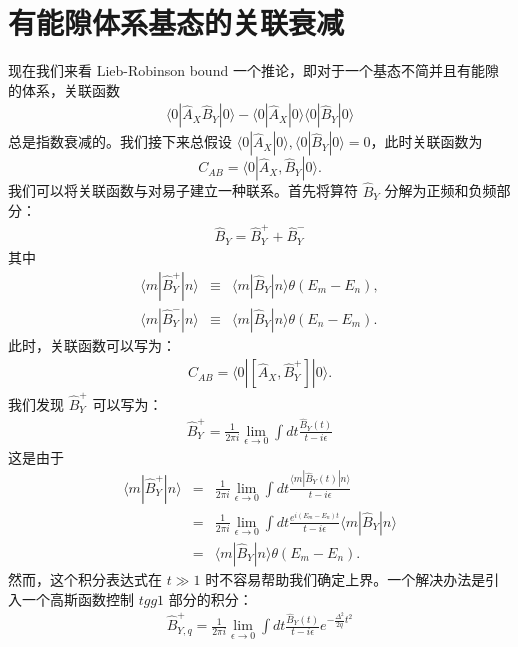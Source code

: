 \documentclass[10pt,UTF8]{ctexart}
\begin{document}
\section*{有能隙体系基态的关联衰减}
\noindent
现在我们来看 Lieb-Robinson bound 一个推论，即对于一个基态不简并且有能隙的体系，关联函数
\begin{eqnarray}
	\langle 0| \hat A_X \hat B_Y |0\rangle - \langle 0| \hat A_X |0\rangle \langle 0|\hat B_Y |0\rangle
\end{eqnarray}
总是指数衰减的。我们接下来总假设 $\langle 0| \hat A_X |0\rangle, \langle 0| \hat B_Y |0\rangle = 0$，此时关联函数为
\begin{equation}
	C_{AB} = \langle 0| \hat A_X, \hat B_Y |0\rangle.
\end{equation}
我们可以将关联函数与对易子建立一种联系。首先将算符 $\hat B_Y$ 分解为正频和负频部分：
\begin{eqnarray}
	\hat B_Y = \hat{B}_{Y}^{+} + \hat{B}_{Y}^{-}
\end{eqnarray}
其中
\begin{eqnarray}
	\langle m| \hat B_{Y}^{+} | n\rangle &\equiv & \langle m| \hat B_{Y} | n\rangle \theta(E_m-E_n), \\
	\langle m| \hat B_{Y}^{-} | n\rangle &\equiv & \langle m| \hat B_{Y} | n\rangle \theta(E_n-E_m).
\end{eqnarray}
此时，关联函数可以写为：
\begin{eqnarray}
	C_{AB} =
	\langle 0| [\hat A_{X}, \hat B_{Y}^{+}] |0\rangle.
\end{eqnarray}
我们发现 $\hat{B}_{Y}^{+}$ 可以写为：
\begin{eqnarray}
	\hat{B}_{Y}^{+} = \frac{1}{2\pi i} \lim_{\epsilon\rightarrow 0} \int dt \frac{\hat{B}_{Y}(t)}{t-i\epsilon}
\end{eqnarray}
这是由于
\begin{eqnarray}
	\langle m| \hat B_{Y}^{+} | n\rangle
	&=& \frac{1}{2\pi i} \lim_{\epsilon\rightarrow 0} \int dt \frac{\langle m| \hat B_{Y}(t) | n\rangle}{t-i\epsilon} \nonumber \\
	&=& \frac{1}{2\pi i} \lim_{\epsilon\rightarrow 0} \int dt \frac{e^{i(E_m-E_n)t}}{t-i\epsilon}\langle m| \hat B_{Y} | n\rangle \nonumber \\
	&=& \langle m| \hat B_{Y} | n\rangle \theta(E_m-E_n).
\end{eqnarray}
然而，这个积分表达式在 $t \gg 1$ 时不容易帮助我们确定上界。一个解决办法是引入一个高斯函数控制 $t gg 1$ 部分的积分：
\begin{eqnarray}
	\hat{B}_{Y,q}^{+} = \frac{1}{2\pi i} \lim_{\epsilon\rightarrow 0} \int dt \frac{\hat{B}_{Y}(t)}{t-i\epsilon} e^{-\frac{\Delta^2}{2q}t^2}
\end{eqnarray}
\end{document}
